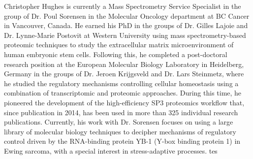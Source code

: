 \documentclass[11pt]{article}
\begin{document}
\noindent 
Christopher Hughes is currently a Mass Spectrometry Service Specialist in the group of Dr. Poul Sorensen in the Molecular Oncology department at BC Cancer in Vancouver, Canada. He earned his PhD in the groups of Dr. Gilles Lajoie and Dr. Lynne-Marie Postovit at Western University using mass spectrometry-based proteomic techniques to study the extracellular matrix microenvironment of human embryonic stem cells. Following this, he completed a post-doctoral research position at the European Molecular Biology Laboratory in Heidelberg, Germany in the groups of Dr. Jeroen Krijgsveld and Dr. Lars Steinmetz, where he studied the regulatory mechanisms controlling cellular homeostasis using a combination of transcriptomic and proteomic approaches. During this time, he pioneered the development of the high-efficiency SP3 proteomics workflow that, since publication in 2014, has been used in more than 325 individual research publications. Currently, his work with Dr. Sorensen focuses on using a large library of molecular biology techniques to decipher mechanisms of regulatory control driven by the RNA-binding protein YB-1 (Y-box binding protein 1) in Ewing sarcoma, with a special interest in stress-adaptive processes. tes
\end{document}
